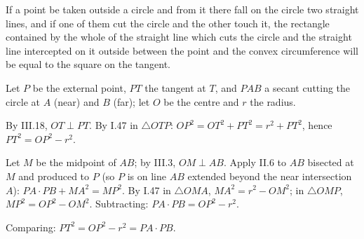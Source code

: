 \begin{claim}
\label{prop:III.36}
If a point be taken outside a circle and from it there fall on the
circle two straight lines, and if one of them cut the circle and the
other touch it, the rectangle contained by the whole of the straight
line which cuts the circle and the straight line intercepted on it
outside between the point and the convex circumference will be equal
to the square on the tangent.
\end{claim}
\begin{evidence}
\label{ev:III.36}

Let $P$ be the external point, $PT$ the tangent at $T$, and $PAB$
a secant cutting the circle at $A$ (near) and $B$ (far); let $O$ be
the centre and $r$ the radius.

By III.18, $OT \perp PT$.  By I.47 in $\triangle OTP$: $OP^2 =
OT^2 + PT^2 = r^2 + PT^2$, hence $PT^2 = OP^2 - r^2$.

Let $M$ be the midpoint of $AB$; by III.3, $OM \perp AB$.  Apply
II.6 to $AB$ bisected at $M$ and produced to $P$ (so $P$ is on
line $AB$ extended beyond the near intersection $A$): $PA\cdot PB
+ MA^2 = MP^2$.  By I.47 in $\triangle OMA$, $MA^2 = r^2 - OM^2$;
in $\triangle OMP$, $MP^2 = OP^2 - OM^2$.  Subtracting:
$PA\cdot PB = OP^2 - r^2$.

Comparing: $PT^2 = OP^2 - r^2 = PA\cdot PB$.
\end{evidence}

